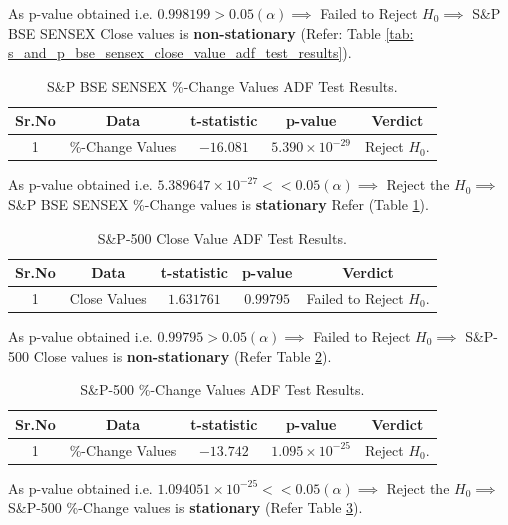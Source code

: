 \documentclass[conference]{IEEEtran}
\begin{document}
As p-value obtained i.e. $0.998199 > 0.05 (\alpha) \implies$ Failed to Reject $H_{0} \implies$ S\&P BSE SENSEX Close values is \textbf{non-stationary} (Refer: Table \ref{tab: s_and_p_bse_sensex_close_value_adf_test_results}).

\begin{table}[htbp]
	\caption{S\&P BSE SENSEX \%-Change Values ADF Test Results.}
	\centering
	\begin{tabular}{|c|c|c|c|c|}
		\hline
		\textbf{Sr.No} & \textbf{Data}    & \textbf{t-statistic} & \textbf{p-value}        & \textbf{Verdict} \\
		\hline
		1              & \%-Change Values & $-16.081$            & $5.390 \times 10^{-29}$ & Reject $H_{0}$.    \\
		\hline
	\end{tabular}
	\label{tab: s_and_p_bse_sensex_percentage_change_value_adf_test}
\end{table}
As p-value obtained i.e. $5.389647 \times 10^{-27} << 0.05 (\alpha) \implies$ Reject the $H_{0} \implies$ S\&P BSE SENSEX \%-Change values is \textbf{stationary} Refer (Table \ref{tab: s_and_p_bse_sensex_percentage_change_value_adf_test}).

\begin{table}[htbp]
	\caption{S\&P-500 Close Value ADF Test Results.}
	\begin{tabular}{|c|c|c|c|c|}
		\hline
		\textbf{Sr.No} & \textbf{Data} & \textbf{t-statistic} & \textbf{p-value} & \textbf{Verdict}        \\
		\hline
		1              & Close Values  & $1.631761$           & $0.99795$        & Failed to Reject $H_{0}$. \\
		\hline
	\end{tabular}
	\label{tab: s_and_p_500_close_value_adf_test}
\end{table}
As p-value obtained i.e. $0.99795 > 0.05 (\alpha) \implies$ Failed to Reject $H_{0} \implies$ S\&P-500 Close values is \textbf{non-stationary} (Refer Table \ref{tab: s_and_p_500_close_value_adf_test}).
	
\begin{table}[htbp]
	\centering
	\caption{S\&P-500 \%-Change Values ADF Test Results.}
	\begin{tabular}{|c|c|c|c|c|}
		\hline
		\textbf{Sr.No} & \textbf{Data}    & \textbf{t-statistic} & \textbf{p-value}        & \textbf{Verdict} \\
		\hline
		1              & \%-Change Values & $-13.742$            & $1.095 \times 10^{-25}$ & Reject $H_{0}$.    \\
		\hline
	\end{tabular}
	\label{tab: s_and_p_500_percentage_close_value_adf_test}
\end{table}
As p-value obtained i.e. $1.094051 \times 10^{-25} << 0.05 (\alpha) \implies$ Reject the $H_{0} \implies$ S\&P-500 \%-Change values is \textbf{stationary} (Refer Table \ref{tab: s_and_p_500_percentage_close_value_adf_test}).
\end{document}
